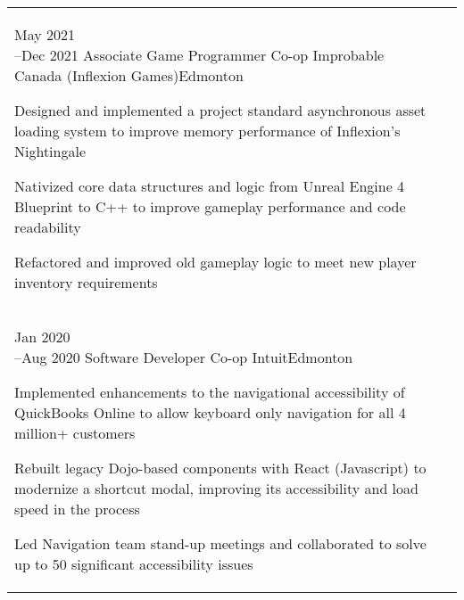 

\section*{}

\begin{tabular}{@{\raggedright}p{} |>{\raggedright\arraybackslash}p{}}
    \cvevent{May 2021\newline --Dec 2021}
    {Associate Game Programmer Co-op}
    {Improbable Canada (Inflexion Games)}{Edmonton}
    {\begin{tabitemize}
        \item Designed and implemented a project standard asynchronous asset loading system to improve memory performance of Inflexion's Nightingale
        \item Nativized core data structures and logic from Unreal Engine 4 Blueprint to C++ to improve gameplay performance and code readability
        \item Refactored and improved old gameplay logic to meet new player inventory requirements
        \vspace{0.5em}
    \end{tabitemize}
    } \\

    \cvevent{Jan 2020\newline --Aug 2020}
    {Software Developer Co-op}
    {Intuit}{Edmonton}
    {\begin{tabitemize}
        \item Implemented enhancements to the navigational accessibility of QuickBooks Online to allow keyboard only navigation for all 4 million+ customers
        \item Rebuilt legacy Dojo-based components with React (Javascript) to modernize a shortcut modal, improving its accessibility and load speed in the process
        \item Led Navigation team stand-up meetings and collaborated to solve up to 50 significant accessibility issues
        \vspace{0.5em}
    \end{tabitemize}
    } \\


\end{tabular}
